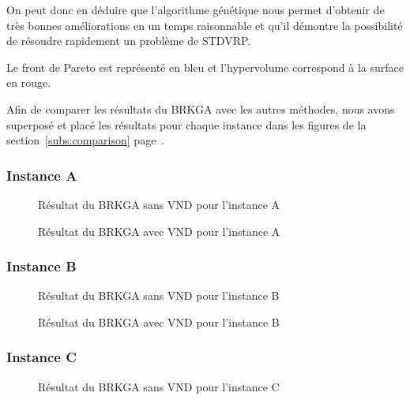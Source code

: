             On peut donc en déduire que l'algorithme génétique nous permet d'obtenir de très bonnes améliorations en un temps raisonnable et qu'il démontre la possibilité de résoudre rapidement un problème de STDVRP.

            Le front de Pareto est représenté en bleu et l'hypervolume correspond à la surface en rouge.

            Afin de comparer les résultats du BRKGA avec les autres méthodes, nous avons superposé et placé les résultats pour chaque instance dans les figures de la section~\ref{subs:comparison} page~\pageref{subs:comparison}.
            
            \subsubsection{Instance A}
                
                \begin{figure}[H]
                	
                \caption{Résultat du BRKGA sans VND pour l'instance A}
				\label{fig:10m2i2d-sansvnd}
				\end{figure}
                
                \begin{figure}[H]
                	
                \caption{Résultat du BRKGA avec VND pour l'instance A}
				\label{fig:10m2i2d-avecvnd}
				\end{figure}
				
            \subsubsection{Instance B}
                \begin{figure}[H]
                	
                \caption{Résultat du BRKGA sans VND pour l'instance B}
				\label{fig:20m3i3d-sansvnd}
				\end{figure}
                
                \begin{figure}[H]
                	
                \caption{Résultat du BRKGA avec VND pour l'instance B}
				\label{fig:20m3i3d-avecvnd}
				\end{figure}
				
            \subsubsection{Instance C}
           		\begin{figure}[H]
                	
                \caption{Résultat du BRKGA sans VND pour l'instance C}
				\label{fig:30m4i3d-sansvnd}
                \end{figure}
                
